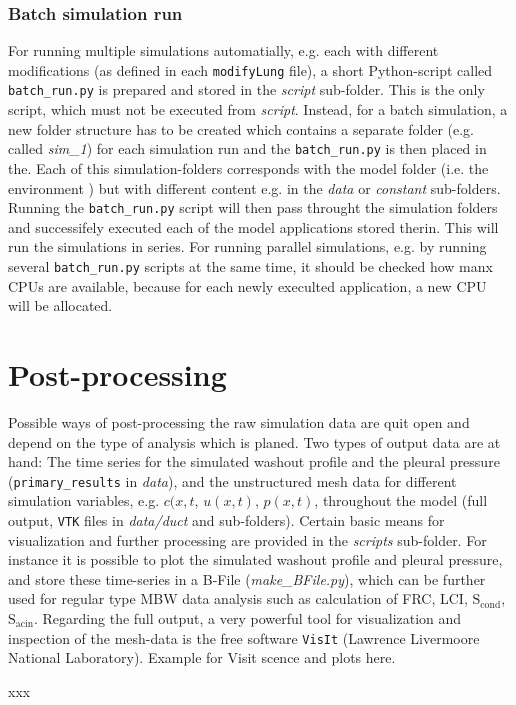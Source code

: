 \subsubsection{Batch simulation run}
For running multiple simulations automatially, e.g. each with different modifications (as defined in each \texttt{modifyLung} file), a short Python-script called \texttt{batch\_run.py} is prepared and stored in the \textit{script} sub-folder.
This is the only script, which must not be executed from \textit{script}.
Instead, for a batch simulation, a new folder structure has to be created which contains a separate folder (e.g. called \textit{sim\_1}) for each simulation run and the \texttt{batch\_run.py} is then placed in the.
Each of this simulation-folders corresponds with the model folder (i.e. the environment ) but with different content e.g. in the \textit{data} or \textit{constant} sub-folders.
Running the \texttt{batch\_run.py} script will then pass throught the simulation folders and successifely executed each of the model applications stored therin.
This will run the simulations in series.
For running parallel simulations, e.g. by running several \texttt{batch\_run.py} scripts at the same time, it should be checked how manx CPUs are available, because for each newly execulted application, a new CPU will be allocated.



\section{Post-processing} \label{sec:post_processing}
Possible ways of post-processing the raw simulation data are quit open and depend on the type of analysis which is planed.
Two types of output data are at hand:
The time series for the simulated washout profile and the pleural pressure (\texttt{primary\_results} in \textit{data}), and the unstructured mesh data for different simulation variables, e.g. $c(x,t$, $u(x,t)$, $p(x,t)$, throughout the model (full output, \texttt{VTK} files in \textit{data/duct} and  sub-folders).
Certain basic means for visualization and further processing are provided in the \textit{scripts} sub-folder.
For instance it is possible to plot the simulated washout profile and pleural pressure, and store these time-series in a B-File (\textit{make\_BFile.py}), which can be further used for regular type MBW data analysis such as calculation of FRC, LCI, $\text{S}_\text{cond}$, $\text{S}_\text{acin}$.
Regarding the full output, a very powerful tool for visualization and inspection of the mesh-data is the free software \texttt{VisIt} (Lawrence Livermoore National Laboratory).
Example for Visit scence and plots here.













xxx
